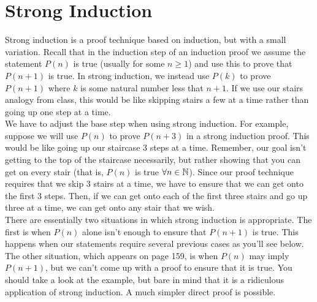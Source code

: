 \chapter{Strong Induction}

\begin{center}
\end{center}

\noindent  Strong induction is a proof technique based on induction, but with a small variation.  Recall that in the induction step of an induction proof we assume the statement $P(n)$ is true (usually for some $n \geq 1$) and use this to prove that $P(n+1)$ is true.  In strong induction, we instead use $P(k)$ to prove $P(n+1)$ where $k$ is some natural number less that $n+1$.  If we use our stairs analogy from class, this would be like skipping stairs a few at a time rather than going up one step at a time.  \\

We have to adjust the base step when using strong induction.  For example, suppose we will use $P(n)$ to prove $P(n+3)$ in a strong induction proof.  This would be like going up our staircase 3 steps at a time.  Remember, our goal isn't getting to the top of the staircase necessarily, but rather showing that you can get on every stair (that is, $P(n)$ is true $\forall n \in \mathbb{N}$).  Since our proof technique requires that we skip 3 stairs at a time, we have to ensure that we can get onto the first 3 steps.  Then, if we can get onto each of the first three stairs and go up three at a time, we can get onto any stair that we wish.\\

There are essentially two situations in which strong induction is appropriate.  The first is when $P(n)$ alone isn't enough to ensure that $P(n+1)$ is true.  This happens when our statements require several previous cases as you'll see below.  The other situation, which appears on page 159, is when $P(n)$ may imply $P(n+1)$, but we can't come up with a proof to ensure that it is true.  You should take a look at the example, but bare in mind that it is a ridiculous application of strong induction.  A much simpler direct proof is possible.

